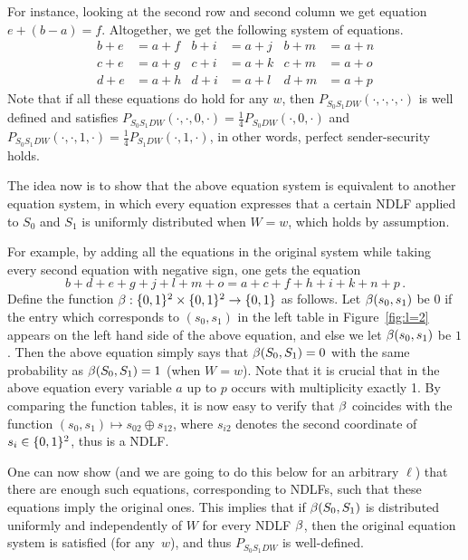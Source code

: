 For instance, looking at the second row and second column we get
equation $e + (b-a) = f$. Altogether, we get the following system of
equations.
%
\begin{align*}
b+e &= a+f   & b+i &= a+j   & b+m &= a+n \\
c+e &= a+g   & c+i &= a+k   & c+m &= a+o \\
d+e &= a+h   & d+i &= a+l   & d+m &= a+p
\end{align*}
%
Note that if all these equations do hold for any $w$, then $P_{S_0
  S_1DW}(\cdot,\cdot,\cdot,\cdot)$ is well defined and satisfies
$P_{S_0 S_1 D W}(\cdot,\cdot,0,\cdot) = \frac14 P_{S_0 D
  W}(\cdot,0,\cdot)$ and $P_{S_0 S_1 D W}(\cdot,\cdot,1,\cdot) =
\frac14 P_{S_1 D W}(\cdot,1,\cdot)$, in other words, perfect
sender-security holds.

The idea now is to show that the above equation system is equivalent
to another equation system, in which every equation expresses that a
certain  NDLF applied to $S_0$
and $S_1$ is uniformly distributed when $W=w$, which holds by
assumption.

For example, by adding all the equations in the original system while
taking every second equation with negative sign, one gets the equation
$$
b+d+e+g+j+l+m+o = a+c+f+h+i+k+n+p \, .
$$
Define the function $\beta:\{0,1\}^2 \times \{0,1\}^2 \rightarrow \{0,1\}$ as follows. Let $\beta(s_0,s_1)$ be $0$ if the entry which corresponds to $(s_0,s_1)$ in the left table in Figure~\ref{fig:l=2} appears on the left hand side of the above equation, and else we let $\beta(s_0,s_1)$ be $1$. Then the above equation simply says that $\beta(S_0,S_1) = 0$ with the same probability as $\beta(S_0,S_1) = 1$ (when $W = w$). 
Note that it is crucial that in the above equation every variable $a$ up to $p$ occurs with multiplicity exactly 1.
By comparing the function tables, it is now easy to verify that $\beta$
coincides with the function $(s_0,s_1) \mapsto s_{02} \oplus s_{12}$, where $s_{i2}$ denotes the second coordinate of $s_i \in \{0,1\}^2$, thus is a NDLF.


One can now show (and we are going to do this below for an arbitrary $\ell$) that there are enough such equations, corresponding to NDLFs, such that these equations imply the original ones. This implies that if $\beta(S_0,S_1)$ is distributed uniformly and independently of $W$ for every NDLF $\beta$, then the original equation system is satisfied (for any~$w$), and thus $P_{S_0 S_1 D W}$ is well-defined. 


